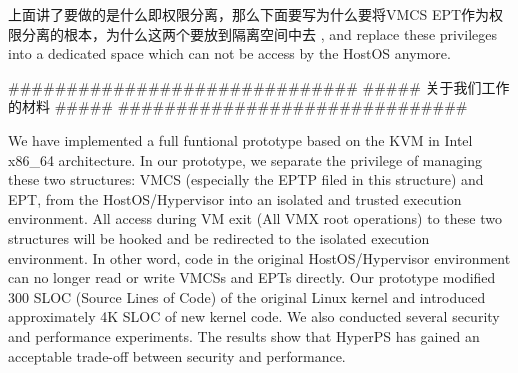 上面讲了要做的是什么即权限分离，那么下面要写为什么要将VMCS EPT作为权限分离的根本，为什么这两个要放到隔离空间中去
, and replace these privileges into a dedicated space which can not be access by the HostOS anymore. 

##############################
##### 关于我们工作的材料 #####
##############################

\fi


We have implemented a full funtional prototype based on the KVM in Intel x86\_64 architecture.
In our prototype, we separate the privilege of managing these two structures: VMCS (especially the EPTP filed in this structure) and EPT, from the HostOS/Hypervisor into an isolated and trusted execution environment. All access during VM exit (All VMX root operations) to these two structures will be hooked and be redirected to the isolated execution environment. In other word, code in the original HostOS/Hypervisor environment can no longer read or write VMCSs and EPTs directly. 
Our prototype modified 300 SLOC (Source Lines of Code) of the original Linux kernel and introduced approximately 4K SLOC of new kernel code. 
We also conducted several security and performance experiments. The results show that HyperPS has gained an acceptable trade-off between security and performance.



\iffalse
在这里，并没有点出同层隔离的特点，我们并不只是在VMM被危害的情况下保护虚拟机，因为对应的方法有很多，我们的方法是同层隔离，这个也是上面的方案的缺点，已经说了方案的缺点，那么下面就是要说同层隔离这个东西，因为是我们的一个亮点。

\fi






















